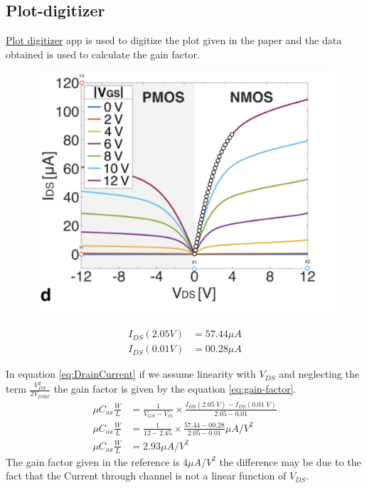 \documentclass{article}
\begin{document}
\subsection*{Plot-digitizer}
\href{https://plotdigitizer.com/app}{Plot digitizer} app is used to digitize the plot given in the paper and the data obtained is used to calculate the gain factor.  
\begin{figure}
        \includegraphics[scale = 0.3]{../Images/Previous/Plot-analyzer.png}        
\end{figure}
    

\begin{align*}
    I_{DS}(2.05 V) &= 57.44 \mu A \\
    I_{DS}(0.01 V) &= 00.28 \mu A 
\end{align*}

In equation \ref{eq:DrainCurrent} if we assume linearity with $V_{DS}$ and neglecting the term $\frac{V_{DS}^2}{2V_{DSat}}$ the gain factor is given by the equation \ref{eq:gain-factor}. 
\begin{align}
    \label{eq:gain-factor}
    \mu C_{ox} \frac{W}{L} &= \frac{1}{V_{GS}-V_{th}}\times\frac{I_{DS}(2.05 \; V) - I_{DS}(0.01 \; V)}{2.05-0.01} \\
    \mu C_{ox} \frac{W}{L} &= \frac{1}{12-2.45}\times\frac{57.44 - 00.28}{2.05-0.01} \mu A/V^2 \\ 
    \mu C_{ox} \frac{W}{L} &= 2.93 \mu A/V^2
\end{align}
The gain factor given in the reference is $4 \mu A/V^2$ the difference may be due to the fact that the Current through channel is not a linear function of $V_{DS}$. 
\newpage
\end{document}
